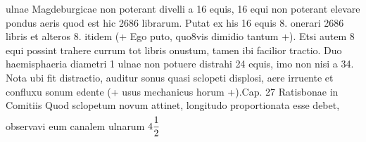                      ulnae Magdeburgicae non poterant divelli a 16 equis, 16 equi  non poterant elevare pondus aeris quod est hic  2686 librarum.  Putat ex his 16 equis 8.  onerari 2686 libris et alteros 8. itidem  (+ Ego puto, quo8vis dimidio tantum +). Etsi autem 8 equi  possint trahere currum tot libris onustum, tamen  ibi facilior tractio. 
                     \pend\pstart
                       Duo haemisphaeria diametri 1 ulnae non potuere  distrahi 24 equis, imo non nisi a 34.  Nota ubi fit distractio, auditur sonus\protect{}  quasi sclopeti displosi, aere irruente et  confluxu sonum\protect{} edente (+ usus mechanicus horum +).\pend \pstart  Cap. 27 Ratisbonae\protect{} in Comitiis \pend \pstart {} Quod sclopetum  novum attinet, longitudo proportionata esse  debet, observavi eum canalem ulnarum $\displaystyle4\frac{1}{2}\rule[-4mm]{0mm}{10mm}\hspace{5.5pt}$%
